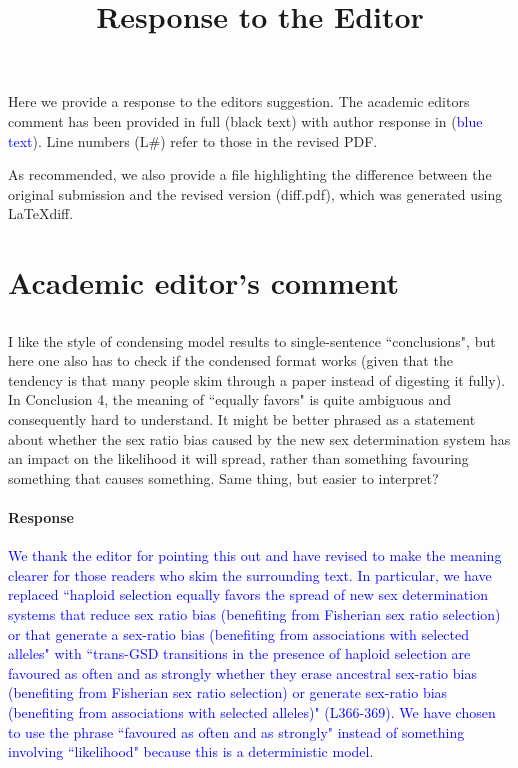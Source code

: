 \documentclass[10pt,letterpaper]{article}
\title{Response to the Editor}
\date{}
\date{\vspace{-5ex}}
\begin{document}
\maketitle

\noindent
Here we provide a response to the editors suggestion. The academic editors comment has been provided in full (black text) with author response in (\textcolor{blue}{blue text}).  Line numbers (L\#) refer to those in the revised PDF.

As recommended, we also provide a file highlighting the difference between the original submission and the revised version (diff.pdf), which was generated using LaTeXdiff.

\section{Academic editor's comment}

\noindent\subsection{}

I like the style of condensing model results to single-sentence ``conclusions", but here one also has to check if the condensed format works (given that the tendency is that many people skim through a paper instead of digesting it fully). In Conclusion 4, the meaning of ``equally favors" is quite ambiguous and consequently hard to understand. It might be better phrased as a statement about whether the sex ratio bias caused by the new sex determination system has an impact on the likelihood it will spread, rather than something favouring something that causes something. Same thing, but easier to interpret?

\noindent\paragraph{Response}
\textcolor{blue}{
We thank the editor for pointing this out and have revised to make the meaning clearer for those readers who skim the surrounding text.
In particular, we have replaced ``haploid selection equally favors the spread of new sex determination systems that reduce sex ratio bias (benefiting from Fisherian sex ratio selection) or that generate a sex-ratio bias (benefiting from associations with selected alleles" with ``trans-GSD transitions in the presence of haploid selection are favoured as often and as strongly whether they erase ancestral sex-ratio bias (benefiting from Fisherian sex ratio selection) or generate sex-ratio bias (benefiting from associations with selected alleles)" (L366-369).
We have chosen to use the phrase ``favoured as often and as strongly" instead of something involving ``likelihood" because this is a deterministic model.
}
\end{document}

